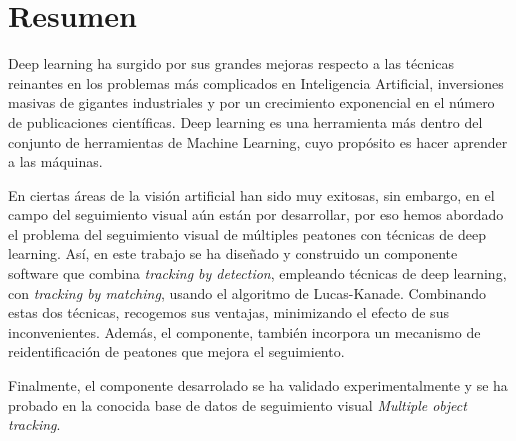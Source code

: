 \chapter*{Resumen}

Deep learning ha surgido por sus grandes mejoras respecto a las técnicas reinantes en los problemas más complicados en Inteligencia Artificial, inversiones masivas de gigantes industriales y por un crecimiento exponencial en el número de publicaciones científicas. Deep learning es una herramienta más dentro del conjunto de herramientas de Machine Learning, cuyo propósito es hacer aprender a las máquinas.

En ciertas áreas de la visión artificial han sido muy exitosas, sin embargo, en el campo del seguimiento visual aún están por desarrollar, por eso hemos abordado el problema del seguimiento visual de múltiples peatones con técnicas de deep learning. Así, en este trabajo se ha diseñado y construido un componente software que combina \textit{tracking by detection}, empleando técnicas de deep learning, con \textit{tracking by matching}, usando el algoritmo de Lucas-Kanade. Combinando estas dos técnicas, recogemos sus ventajas, minimizando el efecto de sus inconvenientes. Además, el componente, también incorpora un mecanismo de reidentificación de peatones que mejora el seguimiento.

Finalmente, el componente desarrolado se ha validado experimentalmente y se ha probado en la conocida base de datos de seguimiento visual \textit{Multiple object tracking}.

